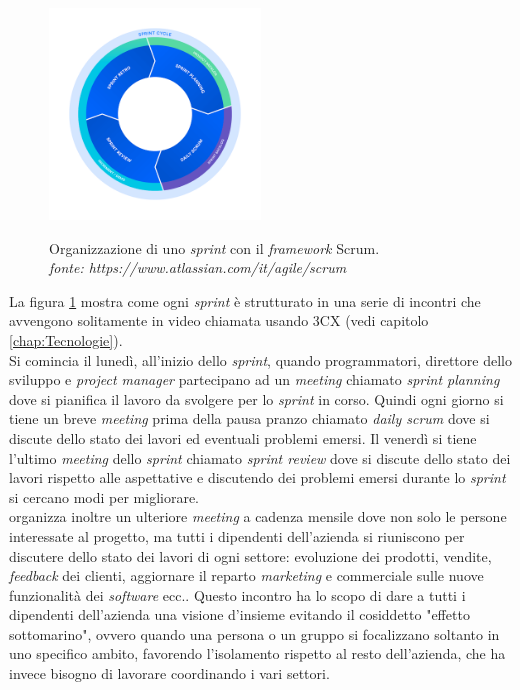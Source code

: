 \begin{figure}[H]
      \centering
      \includegraphics[alt={Organizzazione di uno \textit{sprint} con il \textit{framework} Scrum}, width=0.5\textwidth]{img/scrum.png}
      \caption[Organizzazione di uno \textit{sprint} con il \textit{framework} Scrum]
              {Organizzazione di uno \textit{sprint} con il \textit{framework} Scrum. \\ \textit{fonte: https://www.atlassian.com/it/agile/scrum}}
      \label{fig:scrum}
  \end{figure}

La figura \ref{fig:scrum} mostra come ogni \textit{sprint} è strutturato in una serie di incontri che avvengono solitamente in video chiamata usando 
3CX (vedi capitolo \ref{chap:Tecnologie}).\\ 
Si comincia il lunedì, all'inizio dello \textit{sprint}, quando programmatori, direttore dello sviluppo e \textit{project manager} partecipano 
ad un \textit{meeting} chiamato \textit{sprint planning} dove si pianifica il lavoro da svolgere per lo \textit{sprint} in corso.
Quindi ogni giorno si tiene un breve \textit{meeting} prima della pausa pranzo chiamato \textit{daily scrum} dove si discute dello stato dei lavori ed 
eventuali problemi emersi.
Il venerdì si tiene l'ultimo \textit{meeting} dello \textit{sprint} chiamato \textit{sprint review} dove si discute 
dello stato dei lavori rispetto alle aspettative e discutendo dei problemi emersi durante lo \textit{sprint} si cercano modi per migliorare.\\
{\company} organizza inoltre un ulteriore \textit{meeting} a cadenza mensile dove non solo le persone interessate al progetto, ma tutti i dipendenti dell'azienda 
si riuniscono per discutere dello stato dei lavori di ogni settore: evoluzione dei prodotti, vendite, \textit{feedback} dei clienti, aggiornare il reparto \textit{marketing}
 e commerciale sulle nuove funzionalità dei \textit{software} ecc.. Questo incontro ha 
lo scopo di dare a tutti i dipendenti dell'azienda una visione d'insieme evitando il cosiddetto "effetto sottomarino", ovvero quando una persona o un gruppo si focalizzano 
soltanto in uno specifico ambito, favorendo l'isolamento rispetto al resto dell'azienda, che ha invece bisogno di lavorare coordinando i vari settori.
